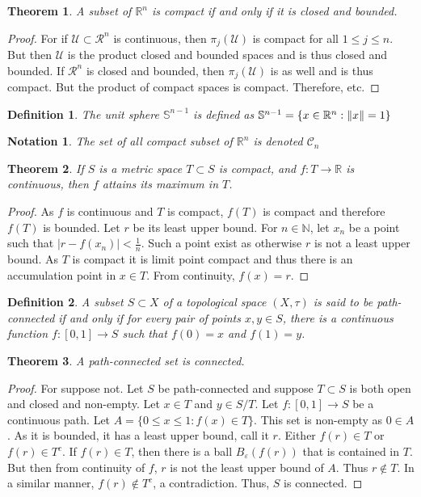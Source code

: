\documentclass[oneside]{book}
\theoremstyle{mystyle}
\newtheorem{theorem}{Theorem}[section]
\newtheorem{definition}{Definition}[section]
\newtheorem{notation}{Notation}[section]
\DeclarePairedDelimiter\norm{\lVert}{\rVert}
\begin{document}
\begin{theorem}
A subset of $\mathbb{R}^n$ is compact if and only if it is closed and bounded.
\end{theorem}
\begin{proof}
For if $\mathcal{U}\subset \mathcal{R}^n$ is continuous, then $\pi_{j}(\mathcal{U})$ is compact for all $1\leq j \leq n$. But then $\mathcal{U}$ is the product closed and bounded spaces and is thus closed and bounded. If $\mathcal{R}^n$ is closed and bounded, then $\pi_j(\mathcal{U})$ is as well and is thus compact. But the product of compact spaces is compact. Therefore, etc.
\end{proof}
\begin{definition}
The unit sphere $\mathbb{S}^{n-1}$ is defined as $\mathbb{S}^{n-1} = \{x\in \mathbb{R}^n: \norm{x}=1\}$
\end{definition}

\begin{notation}
The set of all compact subset of $\mathbb{R}^n$ is denoted $\mathscr{C}_n$
\end{notation}

\begin{theorem}
If $S$ is a metric space $T\subset S$ is compact, and $f:T\rightarrow \mathbb{R}$ is continuous, then $f$ attains its maximum in $T$.
\end{theorem}
\begin{proof}
As $f$ is continuous and $T$ is compact, $f(T)$ is compact and therefore $f(T)$ is bounded. Let $r$ be its least upper bound. For $n\in \mathbb{N}$, let $x_n$ be a point such that $|r-f(x_n)|< \frac{1}{n}$. Such a point exist as otherwise $r$ is not a least upper bound. As $T$ is compact it is limit point compact and thus there is an accumulation point in $x\in T$. From continuity, $f(x) = r$.
\end{proof}

\begin{definition}
A subset $S\subset X$ of a topological space $(X,\tau)$ is said to be path-connected if and only if for every pair of points $x,y\in S$, there is a continuous function $f:[0,1]\rightarrow S$ such that $f(0)=x$ and $f(1)=y$.
\end{definition}

\begin{theorem}
A path-connected set is connected.
\end{theorem}
\begin{proof}
For suppose not. Let $S$ be path-connected and suppose $T\subset S$ is both open and closed and non-empty. Let $x\in T$ and $y\in S/T$. Let $f:[0,1]\rightarrow S$ be a continuous path. Let $A =\{0\leq x \leq 1: f(x) \in T\}$. This set is non-empty as $0\in A$. As it is bounded, it has a least upper bound, call it $r$. Either $f(r)\in T$ or $f(r)\in T^c$. If $f(r)\in T$, then there is a ball $B_{\varepsilon}(f(r))$ that is contained in $T$. But then from continuity of $f$, $r$ is not the least upper bound of $A$. Thus $r\notin T$. In a similar manner, $f(r)\notin T^c$, a contradiction. Thus, $S$ is connected.
\end{proof}
%
\end{document}
